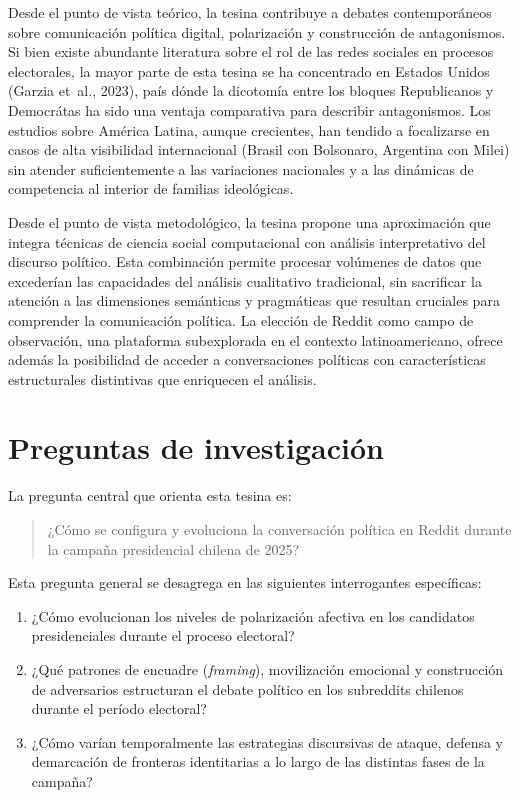 \documentclass[
  letterpaper,
  numbers=noendperiod,
  fontsize=11pt,
  DIV=12,
  titlepage=false]{scrreprt}
\begin{document}
Desde el punto de vista teórico, la tesina contribuye a debates
contemporáneos sobre comunicación política digital, polarización y
construcción de antagonismos. Si bien existe abundante literatura sobre
el rol de las redes sociales en procesos electorales, la mayor parte de
esta tesina se ha concentrado en Estados Unidos (Garzia et~al., 2023),
país dónde la dicotomía entre los bloques Republicanos y Democrátas ha
sido una ventaja comparativa para describir antagonismos. Los estudios
sobre América Latina, aunque crecientes, han tendido a focalizarse en
casos de alta visibilidad internacional (Brasil con Bolsonaro, Argentina
con Milei) sin atender suficientemente a las variaciones nacionales y a
las dinámicas de competencia al interior de familias ideológicas.

Desde el punto de vista metodológico, la tesina propone una aproximación
que integra técnicas de ciencia social computacional con análisis
interpretativo del discurso político. Esta combinación permite procesar
volúmenes de datos que excederían las capacidades del análisis
cualitativo tradicional, sin sacrificar la atención a las dimensiones
semánticas y pragmáticas que resultan cruciales para comprender la
comunicación política. La elección de Reddit como campo de observación,
una plataforma subexplorada en el contexto latinoamericano, ofrece
además la posibilidad de acceder a conversaciones políticas con
características estructurales distintivas que enriquecen el análisis.

\section{Preguntas de
investigación}\label{preguntas-de-investigaciuxf3n}

La pregunta central que orienta esta tesina es:

\begin{quote}
¿Cómo se configura y evoluciona la conversación política en Reddit
durante la campaña presidencial chilena de 2025?
\end{quote}

Esta pregunta general se desagrega en las siguientes interrogantes
específicas:

\begin{enumerate}
\def\labelenumi{\arabic{enumi}.}
\item
  ¿Cómo evolucionan los niveles de polarización afectiva en los
  candidatos presidenciales durante el proceso electoral?
\item
  ¿Qué patrones de encuadre (\emph{framing}), movilización emocional y
  construcción de adversarios estructuran el debate político en los
  subreddits chilenos durante el período electoral?
\item
  ¿Cómo varían temporalmente las estrategias discursivas de ataque,
  defensa y demarcación de fronteras identitarias a lo largo de las
  distintas fases de la campaña?
\end{enumerate}
\end{document}
